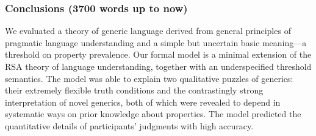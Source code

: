 \documentclass[10pt,letterpaper]{article}
\begin{document}
%

\subsubsection*{Conclusions (3700 words up to now)}


We evaluated a theory of generic language derived from general principles of pragmatic language understanding and a simple but uncertain basic meaning---a threshold on property prevalence.
Our formal model is a minimal extension of the RSA theory of language understanding, together with an underspecified threshold semantics.
The model was able to explain two qualitative puzzles of generics: their extremely flexible truth conditions and the contrastingly strong interpretation of novel generics, both of which were revealed to depend in systematic ways on prior knowledge about properties. The model predicted the quantitative details of participants' judgments with high accuracy.
\end{document}
